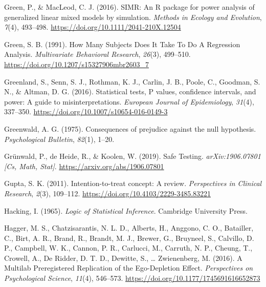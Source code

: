 \documentclass[
  letterpaper,
  DIV=11,
  numbers=noendperiod]{scrreprt}
\newlength{\cslhangindent}
\newlength{\cslentryspacingunit} %
\newenvironment{CSLReferences}[2] %
 {%
  \setlength{\parindent}{0pt}
  \ifodd #1
  \let\oldpar\par
  \def\par{\hangindent=\cslhangindent\oldpar}
  \fi
  \setlength{\parskip}{#2\cslentryspacingunit}
 }%
 {}
\begin{document}
\begin{CSLReferences}{1}{0}
\leavevmode{}%
Green, P., \& MacLeod, C. J. (2016). {SIMR}: An {R} package for power
analysis of generalized linear mixed models by simulation. \emph{Methods
in Ecology and Evolution}, \emph{7}(4), 493--498.
\url{https://doi.org/10.1111/2041-210X.12504}

\leavevmode{}%
Green, S. B. (1991). How {Many Subjects Does It Take To Do A Regression
Analysis}. \emph{Multivariate Behavioral Research}, \emph{26}(3),
499--510. \url{https://doi.org/10.1207/s15327906mbr2603_7}

\leavevmode{}%
Greenland, S., Senn, S. J., Rothman, K. J., Carlin, J. B., Poole, C.,
Goodman, S. N., \& Altman, D. G. (2016). Statistical tests, {P} values,
confidence intervals, and power: A guide to misinterpretations.
\emph{European Journal of Epidemiology}, \emph{31}(4), 337--350.
\url{https://doi.org/10.1007/s10654-016-0149-3}

\leavevmode{}%
Greenwald, A. G. (1975). Consequences of prejudice against the null
hypothesis. \emph{Psychological Bulletin}, \emph{82}(1), 1--20.

\leavevmode{}%
Grünwald, P., de Heide, R., \& Koolen, W. (2019). Safe {Testing}.
\emph{arXiv:1906.07801 {[}Cs, Math, Stat{]}}.
\url{https://arxiv.org/abs/1906.07801}

\leavevmode{}%
Gupta, S. K. (2011). Intention-to-treat concept: {A} review.
\emph{Perspectives in Clinical Research}, \emph{2}(3), 109--112.
\url{https://doi.org/10.4103/2229-3485.83221}

\leavevmode{}%
Hacking, I. (1965). \emph{Logic of {Statistical Inference}}. {Cambridge
University Press}.

\leavevmode{}%
Hagger, M. S., Chatzisarantis, N. L. D., Alberts, H., Anggono, C. O.,
Batailler, C., Birt, A. R., Brand, R., Brandt, M. J., Brewer, G.,
Bruyneel, S., Calvillo, D. P., Campbell, W. K., Cannon, P. R., Carlucci,
M., Carruth, N. P., Cheung, T., Crowell, A., De Ridder, D. T. D.,
Dewitte, S., \ldots{} Zwienenberg, M. (2016). A {Multilab Preregistered
Replication} of the {Ego-Depletion Effect}. \emph{Perspectives on
Psychological Science}, \emph{11}(4), 546--573.
\url{https://doi.org/10.1177/1745691616652873}


\end{CSLReferences}
\end{document}
